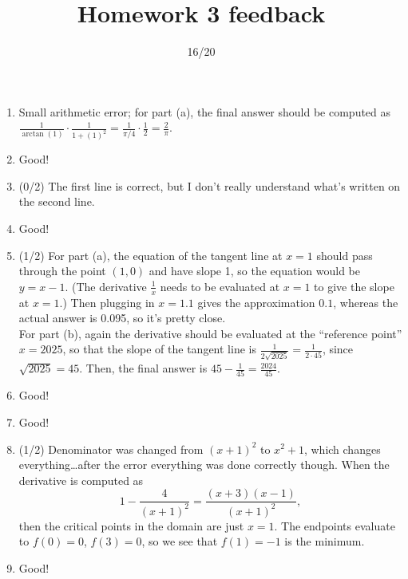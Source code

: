 \documentclass{article}
\title{Homework 3 feedback}
\author{16/20}
\date{}
\begin{document}
\maketitle
\begin{enumerate}
	\item Small arithmetic error; for part (a), the final answer should be computed as $\frac{1}{\operatorname{arctan}(1)} \cdot \frac{1}{1+(1)^{2}} = \frac{1}{\pi/4} \cdot \frac{1}{2} = \frac{2}{\pi}$.
	\item Good!
	\item (0/2) The first line is correct, but I don't really understand what's written on the second line.
	\item Good! 
	\item (1/2) For part (a), the equation of the tangent line at $x = 1$ should pass through the point $(1,0)$ and have slope 1, so the equation would be $y = x-1$. (The derivative $\frac{1}{x}$ needs to be evaluated at $x=1$ to give the slope at $x=1$.) Then plugging in $x = 1.1$ gives the approximation $0.1$, whereas the actual answer is 0.095, so it's pretty close.\\
		For part (b), again the derivative should be evaluated at the ``reference point'' $x = 2025$, so that the slope of the tangent line is $\frac{1}{2 \sqrt{2025}} = \frac{1}{2 \cdot 45}$, since $\sqrt{2025} = 45$. Then, the final answer is $45 - \frac{1}{45} = \frac{2024}{45}$.
	\item Good!
	\item Good! 
	\item (1/2) Denominator was changed from $(x+1)^{2}$ to $x^{2} + 1$, which changes everything\ldots after the error everything was done correctly though. When the derivative is computed as
		\[
			1 - \frac{4}{(x+1)^{2}} = \frac{(x+3)(x-1)}{(x+1)^{2}},
		\]
		then the critical points in the domain are just $x=1$. The endpoints evaluate to $f(0) = 0$, $f(3) = 0$, so we see that $f(1) = -1$ is the minimum.
	\item Good!
\end{enumerate}
\end{document}
